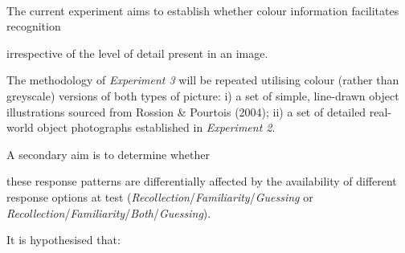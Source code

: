 \documentclass[
  11pt,
]{article}
\begin{document}
~

The current experiment aims to establish whether colour information
facilitates recognition

irrespective of the level of detail present in an image.

The methodology of \emph{Experiment 3} will be repeated utilising colour
(rather than greyscale) versions of both types of picture: i) a set of
simple, line-drawn object illustrations sourced from Rossion \& Pourtois
(2004); ii) a set of detailed real-world object photographs established
in \emph{Experiment 2}.

A secondary aim is to determine whether

these response patterns are differentially affected by the availability
of different response options at test
(\emph{Recollection}/\emph{Familiarity}/\emph{Guessing} or
\emph{Recollection}/\emph{Familiarity}/\emph{Both}/\emph{Guessing}).

It is hypothesised that:
\end{document}
